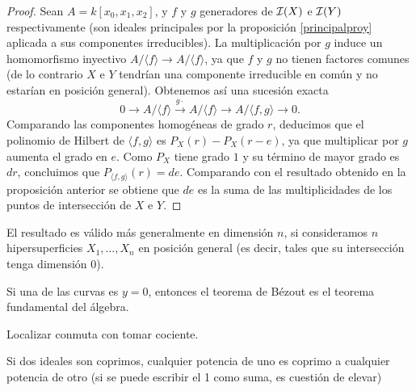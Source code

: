 \documentclass[ACGA.tex]{subfiles}
\begin{document}
\begin{proof}
 Sean $A=k[x_0,x_1,x_2]$, y $f$ y $g$ generadores de $\mathcal{I}(X)$ e $\mathcal{I}(Y)$ respectivamente (son ideales principales por la proposición \ref{principalproy} aplicada a sus componentes irreducibles). La multiplicación por $g$ induce un homomorfismo inyectivo $A/\langle f\rangle\to A/\langle f\rangle$, ya que $f$ y $g$ no tienen factores comunes (de lo contrario $X$ e $Y$ tendrían una componente irreducible en común y no estarían en posición general). Obtenemos así una sucesión exacta
$$
0\to A/\langle f\rangle\stackrel{g\cdot}{\to} A/\langle f\rangle\to A/\langle f,g\rangle\to 0.
$$
Comparando las componentes homogéneas de grado $r$, deducimos que el polinomio de Hilbert de $\langle f,g\rangle$ es $P_X(r)-P_X(r-e)$, ya que multiplicar por $g$ aumenta el grado en $e$. Como $P_X$ tiene grado $1$ y su término de mayor grado es $dr$, concluimos que $P_{\langle f,g\rangle}(r)=de$. Comparando con el resultado obtenido en la proposición anterior se obtiene que $de$ es la suma de las multiplicidades de los puntos de intersección de $X$ e $Y$. 
\end{proof}

El resultado es válido más generalmente en dimensión $n$, si consideramos $n$ hipersuperficies $X_1,\ldots,X_n$ en posición general (es decir, tales que su intersección tenga dimensión $0$).

\begin{observaciones}
Si una de las curvas es $y=0$, entonces el teorema de Bézout es el teorema fundamental del álgebra.

Localizar conmuta con tomar cociente.

Si dos ideales son coprimos, cualquier potencia de uno es coprimo a cualquier potencia de otro (si se puede escribir el 1 como suma, es cuestión de elevar)

\end{observaciones}
\end{document}
